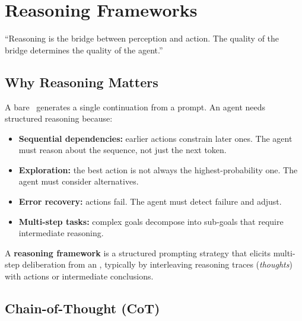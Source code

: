 \chapter{Reasoning Frameworks}
\label{ch:reasoning}

\epigraph{``Reasoning is the bridge between perception and action. The quality of the bridge determines the quality of the agent.''}{}


\section{Why Reasoning Matters}

A bare \llm\ generates a single continuation from a prompt. An agent needs structured reasoning because:

\begin{itemize}
	\item \textbf{Sequential dependencies:} earlier actions constrain later ones. The agent must reason about the sequence, not just the next token.
	\item \textbf{Exploration:} the best action is not always the highest-probability one. The agent must consider alternatives.
	\item \textbf{Error recovery:} actions fail. The agent must detect failure and adjust.
	\item \textbf{Multi-step tasks:} complex goals decompose into sub-goals that require intermediate reasoning.
\end{itemize}

\begin{definition}
	A \textbf{reasoning framework} is a structured prompting strategy that elicits multi-step deliberation from an \llm, typically by interleaving reasoning traces (\emph{thoughts}) with actions or intermediate conclusions.
\end{definition}

\section{Chain-of-Thought (CoT)}

